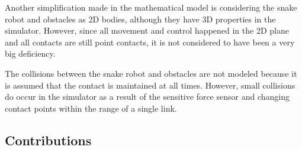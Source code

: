 Another simplification made in the mathematical model is considering the snake robot and obstacles as 2D bodies, although they have 3D properties in the simulator. However, since all movement and control happened in the 2D plane and all contacts are still point contacts, it is not considered to have been a very big deficiency.

The collisions between the snake robot and obstacles are not modeled because it is assumed that the contact is maintained at all times. However, small collisions do occur in the simulator as a result of the sensitive force sensor and changing contact points within the range of a single link.

\subsection{Contributions}

